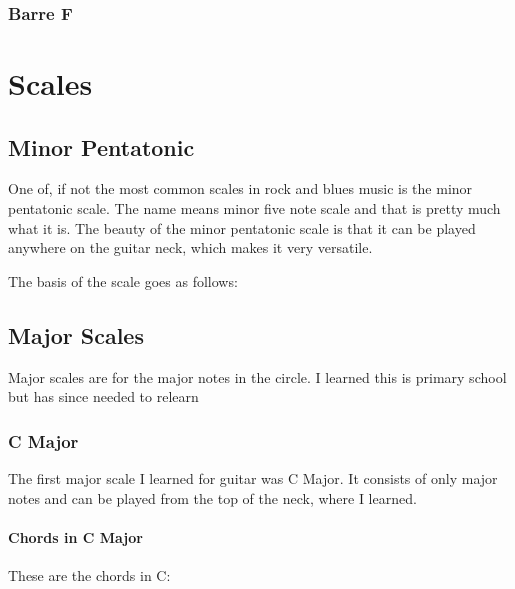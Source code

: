 \documentclass[11pt]{book}
\begin{document}
    \subsection{Barre F}

    \chordscheme[
    name = F,
    finger = {3/5:4,3/4:4,2/3:2},
    barre = {1/1-6:1}
    ]


    \chapter{Scales}


    \section{Minor Pentatonic}
    One of, if not the most common scales in rock and blues music is the minor pentatonic scale.
    The name means minor five note scale and that is pretty much what it is.
    The beauty of the minor pentatonic scale is that it can be played anywhere on the guitar neck, which makes it very versatile.

    The basis of the scale goes as follows:

    \bigskip

    \scales[
    name = Minor Pentatonic,
    finger = {
    2/1:1, 5/1:4,
    2/2:1, 5/2:4,
    2/3:1, 4/3:3,
    2/4:1, 4/4:3,
    2/5:1, 4/5:3,
    2/6:1, 5/6:4
    },
    root = {2/6, 4/4, 2/1}
    ]


    \section{Major Scales}
    Major scales are for the major notes in the circle.
    I learned this is primary school but has since needed to relearn

    \subsection{C Major}
    The first major scale I learned for guitar was C Major.
    It consists of only major notes and can be played from the top of the neck, where I learned.

    \scales[
    name = C Major
    position = 1,
    finger = {
    1/1:1,3/1:3,
    1/2:1,3/2:3,
    2/3:2,
    2/4:2,3/4:3,
    2/5:2,3/5:3,
    1/6:2,3/6:3
    }
    ]

    \subsubsection{Chords in C Major}
    These are the chords in C:
\end{document}

